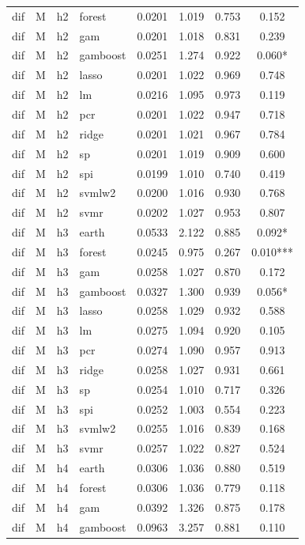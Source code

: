 \begin{ThreePartTable}
\begin{longtable}[t]{llclcccc}
dif & M & h2 & forest & 0.0201 & 1.019 & 0.753 & 0.152\\
dif & M & h2 & gam & 0.0201 & 1.018 & 0.831 & 0.239\\
dif & M & h2 & gamboost & 0.0251 & 1.274 & 0.922 & 0.060*\\
dif & M & h2 & lasso & 0.0201 & 1.022 & 0.969 & 0.748\\
dif & M & h2 & lm & 0.0216 & 1.095 & 0.973 & 0.119\\
dif & M & h2 & pcr & 0.0201 & 1.022 & 0.947 & 0.718\\
dif & M & h2 & ridge & 0.0201 & 1.021 & 0.967 & 0.784\\
dif & M & h2 & sp & 0.0201 & 1.019 & 0.909 & 0.600\\
dif & M & h2 & spi & 0.0199 & 1.010 & 0.740 & 0.419\\
dif & M & h2 & svmlw2 & 0.0200 & 1.016 & 0.930 & 0.768\\
dif & M & h2 & svmr & 0.0202 & 1.027 & 0.953 & 0.807\\
\addlinespace
dif & M & h3 & earth & 0.0533 & 2.122 & 0.885 & 0.092*\\
dif & M & h3 & forest & 0.0245 & 0.975 & 0.267 & 0.010***\\
dif & M & h3 & gam & 0.0258 & 1.027 & 0.870 & 0.172\\
dif & M & h3 & gamboost & 0.0327 & 1.300 & 0.939 & 0.056*\\
dif & M & h3 & lasso & 0.0258 & 1.029 & 0.932 & 0.588\\
dif & M & h3 & lm & 0.0275 & 1.094 & 0.920 & 0.105\\
dif & M & h3 & pcr & 0.0274 & 1.090 & 0.957 & 0.913\\
dif & M & h3 & ridge & 0.0258 & 1.027 & 0.931 & 0.661\\
dif & M & h3 & sp & 0.0254 & 1.010 & 0.717 & 0.326\\
dif & M & h3 & spi & 0.0252 & 1.003 & 0.554 & 0.223\\
dif & M & h3 & svmlw2 & 0.0255 & 1.016 & 0.839 & 0.168\\
dif & M & h3 & svmr & 0.0257 & 1.022 & 0.827 & 0.524\\
\addlinespace
dif & M & h4 & earth & 0.0306 & 1.036 & 0.880 & 0.519\\
dif & M & h4 & forest & 0.0306 & 1.036 & 0.779 & 0.118\\
dif & M & h4 & gam & 0.0392 & 1.326 & 0.875 & 0.178\\
dif & M & h4 & gamboost & 0.0963 & 3.257 & 0.881 & 0.110\\

\end{longtable}
\end{ThreePartTable}
